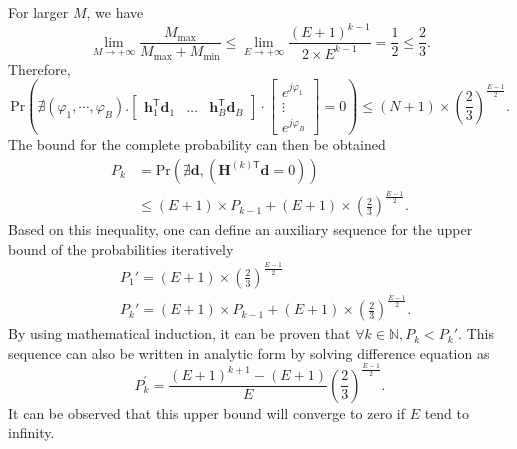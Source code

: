 \documentclass[12pt,draftclsnofoot,onecolumn,journal]{IEEEtran}
\begin{document}
For larger $M$, we have
\begin{equation}
\lim_{M \to +\infty} \frac{M_{\mathrm{max}}}{M_{\mathrm{max}}+M_{\mathrm{min}}}\leq \lim_{E \to +\infty}\frac{(E+1)^{k-1}}{2\times E^{k-1}}=\frac{1}{2}\leq \frac{2}{3}.
\end{equation}
Therefore, 
\begin{equation}
\mathrm{Pr}\left(\nexists (\varphi_1,\cdots, \varphi_B).
\begin{bmatrix}
\mathbf h_1^{\mathsf{T}}\mathbf d_1 &\dots &\mathbf h_B^{\mathsf{T}}\mathbf d_B
\end{bmatrix}\cdot\begin{bmatrix}
 e^{j\varphi_1}\\
 \vdots\\
e^{j\varphi_B}
\end{bmatrix}=0\right)
\leq(N+1)\times \left(\frac 2 3\right)^{\frac{E-1}{2}}.
\end{equation}
The bound for the complete probability can then be obtained
\begin{equation}
\begin{split}
P_k&=\mathrm{Pr}(\nexists \mathbf d,(\mathbf H^{(k)\mathsf{T}} \mathbf d=0))\\
&\leq (E+1)\times P_{k-1}+(E+1)\times \left(\frac 2 3\right)^{\frac{E-1}{2}}.
\end{split}
\end{equation}
Based on this inequality, one can define an auxiliary sequence for the upper bound of the probabilities iteratively
\begin{equation}
\begin{split}
&P_1'=(E+1)\times \left(\frac 2 3\right)^{\frac{E-1}{2}}\\
&P_k'=(E+1)\times P_{k-1}+(E+1)\times \left(\frac 2 3\right)^{\frac{E-1}{2}}.
\end{split}
\end{equation}
By using mathematical induction, it can be proven that $\forall k\in \mathbb N, P_k<P_k'$. This sequence can also be written in analytic form by solving difference equation as
\begin{equation}
P^\prime_k=\frac{(E+1)^{k+1}-(E+1)}{E}\left(\frac{2}{3}\right)^{\frac{E-1}{2}}.
\end{equation}
It can be observed that this upper bound will converge to zero if $E$ tend to infinity.
\end{document}
